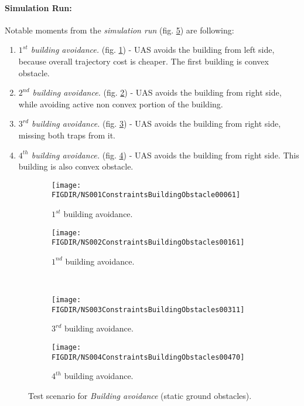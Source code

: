 \noindent\paragraph{Simulation Run:} Notable moments from the \emph{simulation run} (fig. \ref{fig:testCaseBuildingAvoidanceSituation}) are following:
\begin{enumerate}
	\item \emph{$1^{st}$ building avoidance.} (fig. \ref{fig:firstBuildingAvoidance}) - UAS avoids the building from left side, because overall trajectory cost is cheaper. The first building is convex obstacle.
	\item \emph{$2^{nd}$ building avoidance.} (fig. \ref{fig:secondBuildingAvoidance}) - UAS avoids the building from right side, while avoiding active non convex portion of the building.  
	\item \emph{$3^{rd}$ building avoidance.} (fig. \ref{fig:thirdBuidlingAvoidance}) - UAS avoids the building from right side, missing both traps from it.  
	\item \emph{$4^{th}$ building avoidance.} (fig. \ref{fig:fourthBuildingAvoidance}) - UAS avoids the building from right side. This building is also convex obstacle. 
\end{enumerate} 

\begin{figure}[H]
	\centering
	\begin{subfigure}{0.48\textwidth}
		\centering
		\texttt{[image: \\FIGDIR/NS001ConstraintsBuildingObstacle00061]}
		\caption{$1^{st}$ building avoidance.}
		\label{fig:firstBuildingAvoidance}
	\end{subfigure}
	\begin{subfigure}{0.48\textwidth}
		\centering
		\texttt{[image: \\FIGDIR/NS002ConstraintsBuildingObstacles00161]} 
		\caption{$1^{nd}$ building avoidance.}
		\label{fig:secondBuildingAvoidance}
	\end{subfigure}
	\\
	\begin{subfigure}{0.48\textwidth}
		\centering
		\texttt{[image: \\FIGDIR/NS003ConstraintsBuildingObstacles00311]} 
		\caption{$3^{rd}$ building avoidance.}
		\label{fig:thirdBuidlingAvoidance}
	\end{subfigure}
	\begin{subfigure}{0.48\textwidth}
		\centering
		\texttt{[image: \\FIGDIR/NS004ConstraintsBuildingObstacles00470]} 
		\caption{$4^{th}$ building avoidance.}
		\label{fig:fourthBuildingAvoidance}
	\end{subfigure}
	\caption{Test scenario for \emph{Building avoidance} (static ground obstacles). }
	\label{fig:testCaseBuildingAvoidanceSituation}
\end{figure}


